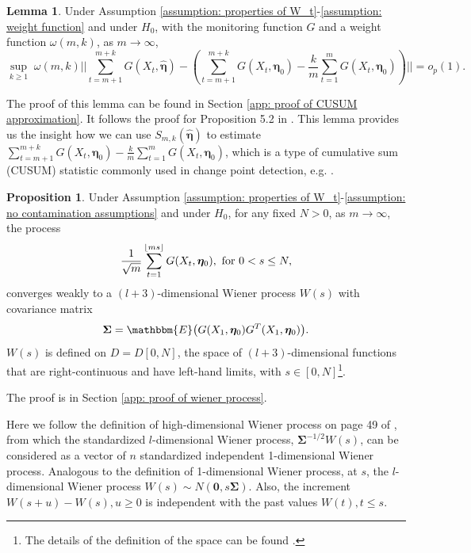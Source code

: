\documentclass{article}
\DeclarePairedDelimiter\floor{\lfloor}{\rfloor}
\theoremstyle{definition}
\newtheorem{lemma}{Lemma}[section]
\newtheorem{proposition}{Proposition}[section]
\begin{document}
\begin{lemma}
\label{proposition: CUSUM approximation}
Under Assumption \ref{assumption: properties of W_t}-\ref{assumption: weight function} and under $H_0$, with the monitoring function $G$ and a weight function $\omega(m,k)$, as $m \rightarrow \infty$,
$$
\underset{k\geq 1}{\sup} \; \omega(m,k)||\sum_{t=m+1}^{m+k} G(X_t,\hat{\bm{\eta}})-(\sum_{t=m+1}^{m+k}G(X_t,\bm{\eta}_0)-\frac{k}{m}\sum_{t=1}^m G(X_t,\bm{\eta}_0))|| = o_p(1).
$$
\end{lemma}

The proof of this lemma can be found in Section \ref{app: proof of CUSUM approximation}. It follows the proof for Proposition 5.2 in \cite{kirch2015use}. This lemma provides us the insight how we can use $S_{m,k}(\hat{\bm{\eta}})$ to estimate $\sum_{t=m+1}^{m+k}G(X_t,\bm{\eta}_0)-\frac{k}{m}\sum_{t=1}^m G(X_t,\bm{\eta}_0)$, which is a type of cumulative sum (CUSUM) statistic commonly used in change point detection, e.g. \cite{lee2003cusum}. 

\begin{proposition}
\label{proposition: wiener processes}
Under Assumption \ref{assumption: properties of W_t}-\ref{assumption: no contamination assumptions} and under $H_0$, for any fixed $N>0$, as $m \rightarrow \infty$, the process
\begin{equation*}
    \frac{1}{\sqrt{m}}\sum_{t=1}^{\floor{ms}}G(X_t,\bm{\eta}_0), \text{ for }0<s \leq N,
\end{equation*}
converges weakly to a $(l+3)$-dimensional Wiener process $W(s)$ with covariance matrix 
\begin{equation*}
    \bm{\Sigma} = \mathbbm{E}\big(G(X_1,\bm{\eta}_0)G^T(X_1,\bm{\eta}_0)\big).
\end{equation*}
$W(s)$ is defined on $D = D[0,N]$, the space of $(l+3)$-dimensional functions that are right-continuous and have left-hand limits, with $s \in [0,N]$\footnote{The details of the definition of the space can be found \cite{oodaira1972functional}.}. 
\end{proposition}
The proof is in Section \ref{app: proof of wiener process}. 

Here we follow the definition of high-dimensional Wiener process on page 49 of  \cite{evans2012introduction}, from which the standardized $l$-dimensional Wiener process, $\bm{\Sigma}^{-1/2}W(s)$, can be considered as a vector of $n$ standardized independent 1-dimensional Wiener process. Analogous to the definition of 1-dimensional Wiener process, at $s$, the $l$-dimensional Wiener process $W(s) \sim N(\bm{0}, s \bm{\Sigma})$. Also, the increment $W(s+u)-W(s), u \geq 0$ is independent with the past values $W(t), t \leq s$. 
\end{document}
